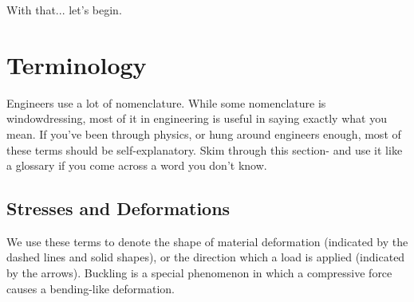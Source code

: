 With that... let's begin.

\chapter{Terminology}

Engineers use a lot of nomenclature. While some nomenclature is windowdressing, most of it in engineering is useful in saying exactly what you mean. If you've been through physics, or hung around engineers enough, most of these terms should be self-explanatory. Skim through this section- and use it like a glossary if you come across a word you don't know.

\section{Stresses and Deformations}
We use these terms to denote the shape of material deformation (indicated by the dashed lines and solid shapes), or the direction which a load is applied (indicated by the arrows). Buckling is a special phenomenon in which a compressive force causes a bending-like deformation.
